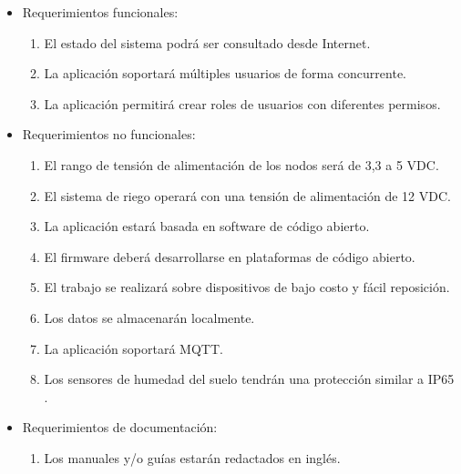 \begin{itemize}
\item Requerimientos funcionales:
\begin{enumerate}

\item El estado del sistema podrá ser consultado desde Internet.
\item La aplicación soportará múltiples usuarios de forma concurrente.
\item La aplicación permitirá crear roles de usuarios con diferentes permisos.
\end{enumerate}
\end{itemize} 
\begin{itemize}
\item Requerimientos no funcionales:
\begin{enumerate}
\item El rango de tensión de alimentación de los nodos será de 3,3 a 5 VDC.
\item El sistema de riego operará con una tensión de alimentación de 12 VDC.
\item La aplicación estará basada en software de código abierto.
\item El firmware deberá desarrollarse en plataformas de código abierto.
\item El trabajo se realizará sobre dispositivos de bajo costo y fácil reposición.
\item Los datos se almacenarán localmente.
\item La aplicación soportará MQTT.
\item Los sensores de humedad del suelo tendrán una protección similar a IP65 \citep{ip65}. 
\end{enumerate}


\end{itemize} 
\begin{itemize}
\item Requerimientos de documentación:
\begin{enumerate}
\item Los manuales y/o guías estarán redactados en inglés.
\end{enumerate}


\end{itemize}
